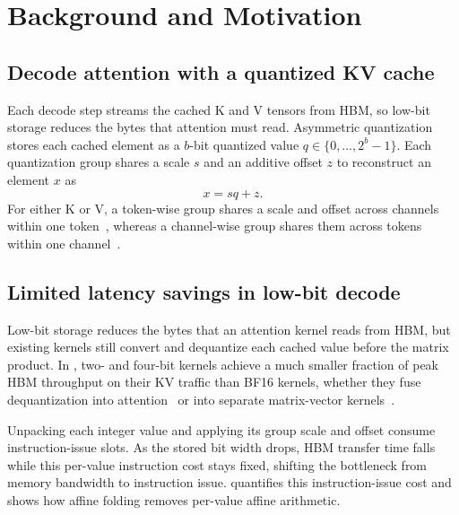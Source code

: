\section{Background and Motivation}
\label{sec:background}

\subsection{Decode attention with a quantized KV cache}
\label{sec:bg-quant}

Each decode step streams the cached K and V tensors from HBM, so low-bit storage reduces the bytes that attention must read.
Asymmetric quantization stores each cached element as a $b$-bit quantized value $q\in\{0,\ldots,2^b-1\}$.
Each quantization group shares a scale $s$ and an additive offset $z$ to reconstruct an element $x$ as
\begin{equation}
x=sq+z.
\label{eq:dequant}
\end{equation}
For either K or V, a token-wise group shares a scale and offset across channels within one token~\cite{yao2022zeroquant}, whereas a channel-wise group shares them across tokens within one channel~\cite{banner2019posttraining}.

\subsection{Limited latency savings in low-bit decode}
\label{sec:bg-latency}

Low-bit storage reduces the bytes that an attention kernel reads from HBM, but existing kernels still convert and dequantize each cached value before the matrix product.
In , two- and four-bit kernels achieve a much smaller fraction of peak HBM throughput on their KV traffic than BF16 kernels, whether they fuse dequantization into attention~\cite{lin2025qserve,kang2025turboattention,du2026bitdecoding,jia2026saw,zhou2026oscar} or into separate matrix-vector kernels~\cite{liu2024kivi}.

Unpacking each integer value and applying its group scale and offset consume instruction-issue slots.
As the stored bit width drops, HBM transfer time falls while this per-value instruction cost stays fixed, shifting the bottleneck from memory bandwidth to instruction issue.
 quantifies this instruction-issue cost and shows how affine folding removes per-value affine arithmetic.
